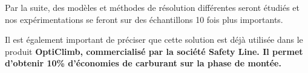 \documentclass[a0,portrait]{a0poster}
\begin{document}
\begin{multicols}{2}
Par la suite, des modèles et méthodes de résolution différentes seront étudiés et nos expérimentations se feront sur des échantillons 10 fois plus importants.

Il est également important de préciser que cette solution est déjà utilisée dans le produit \textbf{OptiClimb, commercialisé par la société Safety Line. Il permet d'obtenir 10\% d'économies de carburant sur la phase de montée.}

\color{DarkSlateGray} %





\small
\nocite{*} %






\end{multicols}
\end{document}
